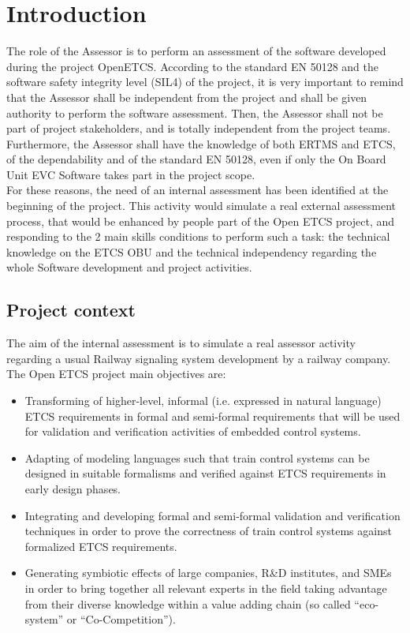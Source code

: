\documentclass{template/openetcs_article}
\begin{document}



\section{Introduction}
The role of the Assessor is to perform an assessment of the software developed during the project OpenETCS. According to the standard EN 50128 and the software safety integrity level (SIL4) of the project, it is very important to remind that the Assessor shall be independent from the project and shall be given authority to perform the software assessment. Then, the Assessor shall not be part of project stakeholders, and is totally independent from the project teams. Furthermore, the Assessor shall have the knowledge of both ERTMS and ETCS, of the dependability and of the standard EN 50128, even if only the On Board Unit EVC Software takes part in the project scope.
\\
For these reasons, the need of an internal assessment has been identified at the beginning of the project. This activity would simulate a real external assessment process, that would be  enhanced by people part of the Open ETCS project, and responding to the 2 main skills conditions to perform such a task: the technical knowledge on the ETCS OBU and the technical independency regarding the whole Software development and project activities. 

\subsection{Project context}
The aim of the internal assessment is to simulate a real assessor activity regarding a usual Railway signaling system development by a railway company. The Open ETCS project main objectives are:
\begin{itemize}
\item Transforming of higher-level, informal (i.e. expressed in natural language) ETCS requirements in formal and semi-formal requirements that will be used for validation and verification activities of embedded control systems.
\item Adapting of modeling languages such that train control systems can be designed in suitable formalisms and verified against ETCS requirements in early design phases.
\item Integrating and developing formal and semi-formal validation and verification techniques in order to prove the correctness of train control systems against formalized ETCS requirements.
\item Generating symbiotic effects of large companies, R\&D institutes, and SMEs in order to bring together all relevant experts in the field taking advantage from their diverse knowledge within a value adding chain (so called “eco-system” or “Co-Competition”).
\end{itemize}
\end{document}
